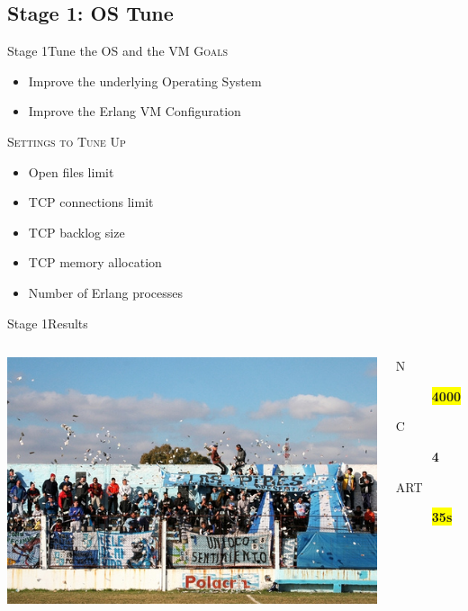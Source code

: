 \documentclass[utf8]{beamer}
\begin{document}
\subsection{Stage 1: OS Tune}
\begin{frame}{Stage 1}{Tune the OS and the VM}
	\textsc{Goals}
	\begin{itemize}
		\item Improve the underlying Operating System
		\item Improve the Erlang VM Configuration
	\end{itemize}
	\pause
	\textsc{Settings to Tune Up}
	\begin{itemize}
		\item Open files limit
		\item TCP connections limit
		\item TCP backlog size
		\item TCP memory allocation
		\item Number of Erlang processes
	\end{itemize}
\end{frame}
\begin{frame}{Stage 1}{Results}
	\begin{columns}
			\includegraphics[top=-1,width=\textwidth]{img/results-2.jpg}
			\begin{description}
				\item[N] \textbf{\colorbox{yellow}{\Large 4000}}
				\item[C] \textbf{\color{red}\Large 4}
				\item[ART] \textbf{\colorbox{yellow}{\color{red}\Large 35s}}
			\end{description}
	\end{columns}
\end{frame}
\end{document}
